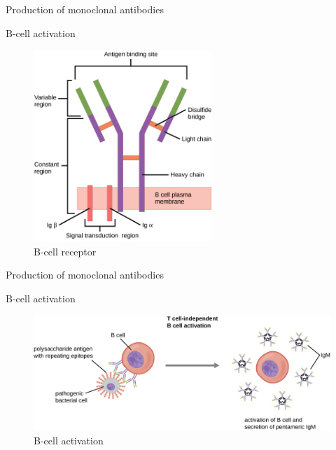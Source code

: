 \begin{frame}{Production of monoclonal antibodies}
    \begin{block}{B-cell activation }

        \begin{figure}
            \centering
            \includegraphics[width=0.6\textwidth]{../Images/B-cell_receptor.jpg}
            \caption{B-cell receptor}
        \end{figure}  
        
    \end{block}
\end{frame}

\begin{frame}{Production of monoclonal antibodies}
    \begin{block}{B-cell activation }
        \vspace{1em}

        \begin{figure}
            \centering
            \includegraphics[width=\textwidth]{../Images/B_cell_activation.jpg}
            \caption{B-cell activation}
        \end{figure}  
        
    \end{block}
\end{frame}